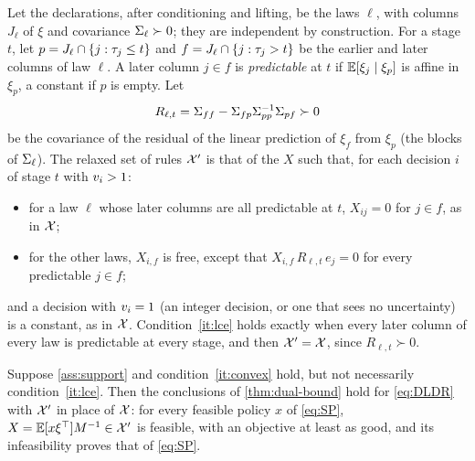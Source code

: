 Let the declarations, after conditioning and lifting, be the laws $\ell$, with columns $J_\ell$ of $\xi$ and covariance $\Sigma_\ell \succ 0$; they are independent by construction.
For a stage $t$, let $p = J_\ell \cap \{j : \tau_j \le t\}$ and $f = J_\ell \cap \{j : \tau_j > t\}$ be the earlier and later columns of law $\ell$.
A later column $j \in f$ is \emph{predictable} at $t$ if $\mathbb{E}[\xi_j \mid \xi_p]$ is affine in $\xi_p$, a constant if $p$ is empty.
Let
\[
R_{\ell,t} = \Sigma_{ff} - \Sigma_{fp}\Sigma_{pp}^{-1}\Sigma_{pf} \succ 0
\]
be the covariance of the residual of the linear prediction of $\xi_f$ from $\xi_p$ (the blocks of $\Sigma_\ell$).
The relaxed set of rules $\mathcal{X}'$ is that of the $X$ such that, for each decision $i$ of stage $t$ with $v_i > 1$:
\begin{itemize}
\item for a law $\ell$ whose later columns are all predictable at $t$, $X_{ij} = 0$ for $j \in f$, as in $\mathcal{X}$;
\item for the other laws, $X_{i,f}$ is free, except that $X_{i,f}\,R_{\ell,t}\,e_j = 0$ for every predictable $j \in f$;
\end{itemize}
and a decision with $v_i = 1$ (an integer decision, or one that sees no uncertainty) is a constant, as in $\mathcal{X}$.
Condition~\ref{it:lce} holds exactly when every later column of every law is predictable at every stage, and then $\mathcal{X}' = \mathcal{X}$, since $R_{\ell,t} \succ 0$.

\begin{proposition}
\label{prop:relaxed-mask}
Suppose \cref{ass:support} and condition~\ref{it:convex} hold, but not necessarily condition~\ref{it:lce}.
Then the conclusions of \cref{thm:dual-bound} hold for \eqref{eq:DLDR} with $\mathcal{X}'$ in place of $\mathcal{X}$:
for every feasible policy $x$ of \eqref{eq:SP}, $X = \mathbb{E}[x\xi^\top]M^{-1} \in \mathcal{X}'$ is feasible, with an objective at least as good,
and its infeasibility proves that of \eqref{eq:SP}.
\end{proposition}

